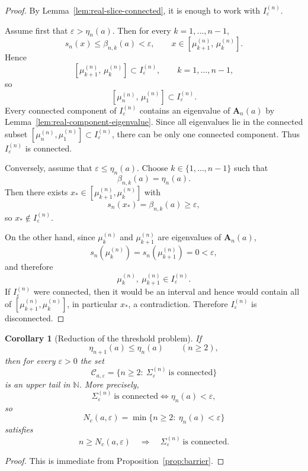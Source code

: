 \documentclass[11pt]{article}
\numberwithin{equation}{section}
\newtheorem{corollary}[theorem]{Corollary}
\newcommand{\N}{\mathbb N}
\newcommand{\A}{\mathbf A}
\begin{document}
\begin{proof}
By Lemma~\ref{lem:real-slice-connected}, it is enough to work with
\(I_\varepsilon^{(n)}\).

Assume first that \(\varepsilon>\eta_n(a)\).  Then for every \(k=1,\dots,n-1\),
\[
s_n(x)\le \beta_{n,k}(a)<\varepsilon,
\qquad
x\in[\mu_{k+1}^{(n)},\,\mu_k^{(n)}].
\]
Hence
\[
[\mu_{k+1}^{(n)},\,\mu_k^{(n)}]\subset I_\varepsilon^{(n)},
\qquad k=1,\dots,n-1,
\]
so
\[
[\mu_n^{(n)},\,\mu_1^{(n)}]\subset I_\varepsilon^{(n)}.
\]
Every connected component of \(I_\varepsilon^{(n)}\) contains an eigenvalue of
\(\A_n(a)\) by Lemma~\ref{lem:real-component-eigenvalue}.  Since all eigenvalues lie
in the connected subset \([\mu_n^{(n)},\mu_1^{(n)}]\subset I_\varepsilon^{(n)}\), there can
be only one connected component. Thus \(I_\varepsilon^{(n)}\) is connected.

Conversely, assume that \(\varepsilon\le \eta_n(a)\).  Choose
\(k\in\{1,\dots,n-1\}\) such that
\[
\beta_{n,k}(a)=\eta_n(a).
\]
Then there exists \(x_*\in[\mu_{k+1}^{(n)},\mu_k^{(n)}]\) with
\[
s_n(x_*)=\beta_{n,k}(a)\ge \varepsilon,
\]
so \(x_*\notin I_\varepsilon^{(n)}\).

On the other hand, since \(\mu_k^{(n)}\) and \(\mu_{k+1}^{(n)}\) are eigenvalues of
\(\A_n(a)\),
\[
s_n(\mu_k^{(n)})=s_n(\mu_{k+1}^{(n)})=0<\varepsilon,
\]
and therefore
\[
\mu_k^{(n)},\ \mu_{k+1}^{(n)}\in I_\varepsilon^{(n)}.
\]
If \(I_\varepsilon^{(n)}\) were connected, then it would be an interval and hence would
contain all of
\(
[\mu_{k+1}^{(n)},\mu_k^{(n)}]
\),
in particular \(x_*\), a contradiction.  Therefore \(I_\varepsilon^{(n)}\) is
disconnected.
\end{proof}

\begin{corollary}[Reduction of the threshold problem]\label{cor:threshold}
If
\[
\eta_{n+1}(a)\le \eta_n(a)\qquad(n\ge2),
\]
then for every \(\varepsilon>0\) the set
\[
\mathcal C_{a,\varepsilon}
=
\{n\ge2:\ \Sigma_\varepsilon^{(n)}\ \text{is connected}\}
\]
is an upper tail in \(\N\).  More precisely,
\[
\Sigma_\varepsilon^{(n)}\ \text{is connected}
\iff
\eta_n(a)<\varepsilon,
\]
so
\[
N_c(a,\varepsilon)=\min\{n\ge2:\ \eta_n(a)<\varepsilon\}
\]
satisfies
\[
n\ge N_c(a,\varepsilon)
\quad\Longrightarrow\quad
\Sigma_\varepsilon^{(n)}\ \text{is connected}.
\]
\end{corollary}

\begin{proof}
This is immediate from Proposition~\ref{prop:barrier}.
\end{proof}
\end{document}
